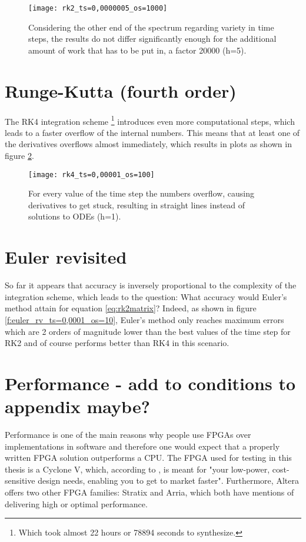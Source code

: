 \begin{figure}[p]
	\centering
	\texttt{[image: rk2\_ts=0,0000005\_os=1000]}
	\caption{Considering the other end of the spectrum regarding variety in time steps, the results do not differ significantly enough for the additional amount of work that has to be put in, a factor 20000 (h=5).}
	\label{f:rk2_ts=0,0000005_os=1000}
\end{figure}

\section{Runge-Kutta (fourth order)}
The RK4 integration scheme \footnote{Which took almost 22 hours or 78894 seconds to synthesize.} introduces even more computational steps, which leads to a faster overflow of the internal numbers. This means that at least one of the derivatives overflows almost immediately, which results in plots as shown in figure \ref{f:rk4_ts=0,00001_os=100}.


\begin{figure}[h]
	\centering
	\texttt{[image: rk4\_ts=0,00001\_os=100]}
	\caption{For every value of the time step the numbers overflow, causing derivatives to get stuck, resulting in straight lines instead of solutions to ODEs (h=1).}
	\label{f:rk4_ts=0,00001_os=100}
\end{figure}

\section{Euler revisited}
So far it appears that accuracy is inversely proportional to the complexity of the integration scheme, which leads to the question: What accuracy would Euler's method attain for equation \ref{eq:rk2matrix}? Indeed, as shown in figure \ref{f:euler_rv_ts=0,0001_os=10}, Euler's method only reaches maximum errors which are 2 orders of magnitude lower than the best values of the time step for RK2 and of course performs better than RK4 in this scenario. 

\section{Performance - add to conditions to appendix maybe?\textbf{}}
Performance is one of the main reasons why people use FPGAs over implementations in software and therefore one would expect that a properly written FPGA solution outperforms a CPU. The FPGA used for testing in this thesis is a Cyclone V, which, according to \cite{AlteraFPGA}, is meant for "your low-power, cost-sensitive design needs, enabling you to get to market faster". Furthermore, Altera offers two other FPGA families: Stratix and Arria, which both have mentions of delivering high or optimal performance. 


